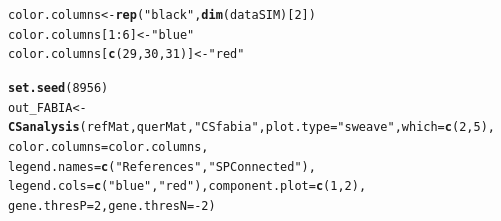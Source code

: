 \documentclass[a4paper]{article}\usepackage[]{graphicx}\usepackage[]{color}
\makeatletter
\newcommand{\hlnum}[1]{\textcolor[rgb]{0.686,0.059,0.569}{#1}}%
\newcommand{\hlstr}[1]{\textcolor[rgb]{0.192,0.494,0.8}{#1}}%
\newcommand{\hlopt}[1]{\textcolor[rgb]{0,0,0}{#1}}%
\newcommand{\hlstd}[1]{\textcolor[rgb]{0.345,0.345,0.345}{#1}}%
\newcommand{\hlkwb}[1]{\textcolor[rgb]{0.69,0.353,0.396}{#1}}%
\newcommand{\hlkwc}[1]{\textcolor[rgb]{0.333,0.667,0.333}{#1}}%
\newcommand{\hlkwd}[1]{\textcolor[rgb]{0.737,0.353,0.396}{\textbf{#1}}}%
\newenvironment{kframe}{%
 \def\at@end@of@kframe{}%
 \ifinner\ifhmode%
  \def\at@end@of@kframe{\end{minipage}}%
  \begin{minipage}{\columnwidth}%
 \fi\fi%
 \def\FrameCommand##1{\hskip\@totalleftmargin \hskip-\fboxsep
 \colorbox{shadecolor}{##1}\hskip-\fboxsep
     \hskip-\linewidth \hskip-\@totalleftmargin \hskip\columnwidth}%
 \MakeFramed {\advance\hsize-\width
   \@totalleftmargin\z@ \linewidth\hsize
   \@setminipage}}%
 {\par\unskip\endMakeFramed%
 \at@end@of@kframe}
\newenvironment{knitrout}{}{} %
\makeatother
\begin{document}
\begin{knitrout}
\color{fgcolor}\begin{kframe}
\begin{alltt}
        \hlstd{color.columns} \hlkwb{<-} \hlkwd{rep}\hlstd{(}\hlstr{"black"}\hlstd{,}\hlkwd{dim}\hlstd{(dataSIM)[}\hlnum{2}\hlstd{])}
        \hlstd{color.columns[}\hlnum{1}\hlopt{:}\hlnum{6}\hlstd{]} \hlkwb{<-} \hlstr{"blue"}
        \hlstd{color.columns[}\hlkwd{c}\hlstd{(}\hlnum{29}\hlstd{,}\hlnum{30}\hlstd{,}\hlnum{31}\hlstd{)]} \hlkwb{<-} \hlstr{"red"}

        \hlkwd{set.seed}\hlstd{(}\hlnum{8956}\hlstd{)}
        \hlstd{out_FABIA} \hlkwb{<-} \hlkwd{CSanalysis}\hlstd{(refMat,querMat,}\hlstr{"CSfabia"}\hlstd{,}\hlkwc{plot.type}\hlstd{=}\hlstr{"sweave"}\hlstd{,}\hlkwc{which}\hlstd{=}\hlkwd{c}\hlstd{(}\hlnum{2}\hlstd{,}\hlnum{5}\hlstd{),}
                        \hlkwc{color.columns}\hlstd{=color.columns,}
                        \hlkwc{legend.names}\hlstd{=}\hlkwd{c}\hlstd{(}\hlstr{"References"}\hlstd{,}\hlstr{"SP Connected"}\hlstd{),}
                        \hlkwc{legend.cols}\hlstd{=}\hlkwd{c}\hlstd{(}\hlstr{"blue"}\hlstd{,}\hlstr{"red"}\hlstd{),} \hlkwc{component.plot}\hlstd{=}\hlkwd{c}\hlstd{(}\hlnum{1}\hlstd{,}\hlnum{2}\hlstd{),}
                        \hlkwc{gene.thresP}\hlstd{=}\hlnum{2}\hlstd{,}\hlkwc{gene.thresN}\hlstd{=}\hlopt{-}\hlnum{2}\hlstd{)}
\end{alltt}
\end{kframe}\begin{figure}[H]



\end{figure}
\end{knitrout}
\end{document}
